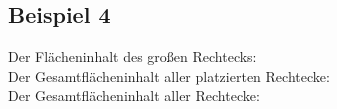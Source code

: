 \subsection{Beispiel 4}\label{ex:4}
Der Flächeninhalt des großen Rechtecks: \\
Der Gesamtflächeninhalt aller platzierten Rechtecke: \\
Der Gesamtflächeninhalt aller Rechtecke: 